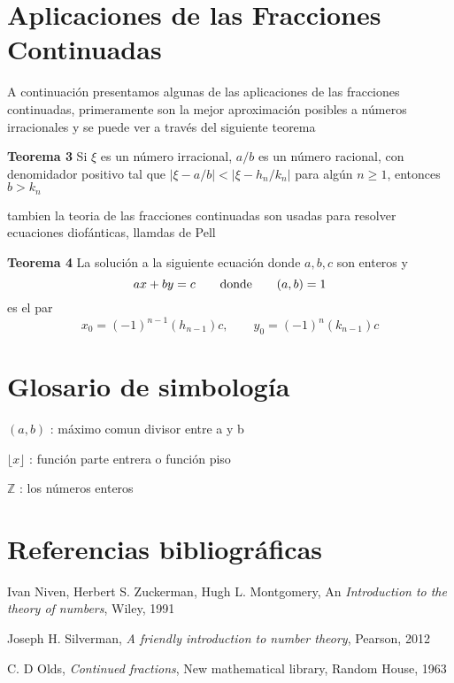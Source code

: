 \documentclass[11pt, article]{article}
\begin{document}
    \section*{Aplicaciones de las Fracciones Continuadas}
     A continuación presentamos algunas de las aplicaciones de las fracciones continuadas, primeramente son la mejor aproximación posibles a números irracionales y se puede ver a través del siguiente teorema
     
     \textbf{Teorema 3} Si $\xi$ es un número irracional, $a/b$ es un número racional, con denomidador positivo tal que $|\xi - a/b|<|\xi-h_n/k_n|$ para algún $n\geq 1$, entonces $b>k_n$
     
     tambien la teoria de las fracciones continuadas son usadas para resolver ecuaciones diofánticas, llamdas de Pell
     
    \textbf{Teorema 4} La solución a la siguiente ecuación donde $a,b,c$ son enteros y 
     \[
     ax+by=c \qquad \textnormal{donde} \qquad (a,b)=1
     \] 
     es el par
     \[
     x_0 = (-1)^{n-1} (h_{n-1})c, \qquad y_0=(-1)^n (k_{n-1})c
     \]
     
     \section*{Glosario de simbología}
     
     $(a,b)$ : máximo comun divisor entre a y b
     
     $\lfloor x \rfloor$ : función parte entrera o función piso
     
     
     $\mathbb{Z}$ : los números enteros
     
     
     \section*{Referencias bibliográficas}
     Ivan Niven, Herbert S. Zuckerman, Hugh L. Montgomery, An \textit{Introduction to the theory of numbers}, Wiley, 1991
     
     Joseph H. Silverman, \textit{A friendly introduction to number theory}, Pearson, 2012
     
     C. D Olds, \textit{Continued fractions}, New mathematical library, Random House, 1963
     
     
\end{document}
